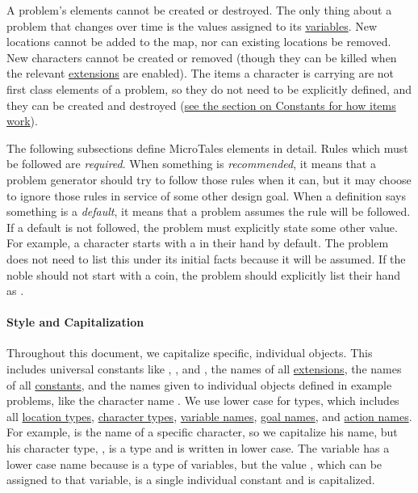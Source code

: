 \documentclass{nilreport}
\begin{document}
A problem's elements cannot be created or destroyed. The only thing about a problem that changes over time is the values assigned to its \hyperref[sec:variables]{variables}. New locations cannot be added to the map, nor can existing locations be removed. New characters cannot be created or removed (though they can be killed when the relevant \hyperref[sec:extensions]{extensions} are enabled). The items a character is carrying are not first class elements of a problem, so they do not need to be explicitly defined, and they can be created and destroyed (\hyperref[sec:constants]{see the section on Constants for how items work}).

The following subsections define MicroTales elements in detail. Rules which must be followed are {\em required}. When something is {\em recommended}, it means that a problem generator should try to follow those rules when it can, but it may choose to ignore those rules in service of some other design goal. When a definition says something is a {\em default}, it means that a problem assumes the rule will be followed. If a default is not followed, the problem must explicitly state some other value. For example, a  character starts with a  in their  hand by default. The problem does not need to list this under its initial facts because it will be assumed. If the noble should not start with a coin, the problem should explicitly list their  hand as \None.

\paragraph{Style and Capitalization}
Throughout this document, we capitalize specific, individual objects. This includes universal constants like , , and \None, the names of all \hyperref[sec:extensions]{extensions}, the names of all \hyperref[sec:constants]{constants}, and the names given to individual objects defined in example problems, like the character name . We use lower case for types, which includes all \hyperref[sec:locations]{location types}, \hyperref[sec:characters]{character types}, \hyperref[sec:variables]{variable names}, \hyperref[sec:goals]{goal names}, and \hyperref[sec:actions]{action names}. For example,  is the name of a specific character, so we capitalize his name, but his character type, , is a type and is written in lower case. The variable  has a lower case name because  is a type of variables, but the value , which can be assigned to that variable, is a single individual constant and is capitalized.
\end{document}
